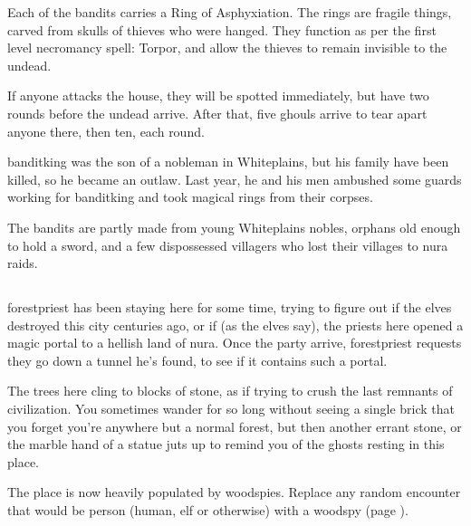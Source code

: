 \begin{multicols}{2}
Each of the bandits carries a Ring of Asphyxiation.
The rings are fragile things, carved from skulls of thieves who were hanged.
They function as per the first level necromancy spell: Torpor, and allow the thieves to remain invisible to the undead.

If anyone attacks the house, they will be spotted immediately, but have two rounds before the undead arrive.
After that, five ghouls arrive to tear apart anyone there, then ten, each round.

\banditking

\Gls{banditking} was the son of a nobleman in Whiteplains, but his family have been killed, so he became an outlaw.
Last year, he and his men ambushed some guards working for \gls{banditking} and took magical rings from their corpses.

The bandits are partly made from young Whiteplains nobles, orphans old enough to hold a sword, and a few dispossessed villagers who lost their villages to nura raids.


\subsection{}\label{lostcity}\setcounter{list}{0}


\Gls{forestpriest} has been staying here for some time, trying to figure out if the elves destroyed this city centuries ago, or if (as the elves say), the priests here opened a magic portal to a hellish land of nura.
Once the party arrive, \gls{forestpriest} requests they go down a tunnel he's found, to see if it contains such a portal.

\begin{boxtext}

The trees here cling to blocks of stone, as if trying to crush the last remnants of civilization.  You sometimes wander for so long without seeing a single brick that you forget you're anywhere but a normal forest, but then another errant stone, or the marble hand of a statue juts up to remind you of the ghosts resting in this place.

\end{boxtext}

The place is now heavily populated by woodspies.  Replace any random encounter that would be person (human, elf or otherwise) with a woodspy (page \pageref{woodspy}).


\end{multicols}

